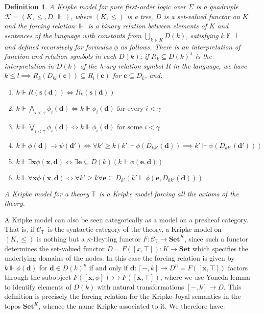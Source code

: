 \documentclass[a4paper,11pt]{article}
\theoremstyle{plain}
\theoremstyle{plain}
\newtheorem{defs}[thm]{Definition}
\theoremstyle{remark}
\newcommand{\synt}[2]{\ensuremath{\mathcal{#1}_{{#2}}}}
\newcommand{\Sets}{\ensuremath{\mathbf{Set}}}
\newcommand{\theory}{\ensuremath{\mathbb{T}}}
\begin{document}
\begin{defs}
 A Kripke model for pure first-order logic over $\Sigma$ is a quadruple $\mathcal{K}=(K, \leq, D, \Vdash)$, where $(K, \leq)$ is a tree, $D$ is a set-valued functor on $K$ and the forcing relation $\Vdash$ is a binary relation between elements of $K$ and sentences of the language with constants from $\bigcup_{k \in K}D(k)$, satisfying $k \nVdash \bot$ and defined recursively for formulas $\phi$ as follows. There is an interpretation of function and relation symbols in each $D(k)$; if $R_k \subseteq D(k)^{\lambda}$ is the interpretation in $D(k)$ of the $\lambda$-ary relation symbol $R$ in the language, we have $k \leq l \implies R_k(D_{kl}(\mathbf{c})) \subseteq R_l(\mathbf{c})$ for $\mathbf{c} \subseteq D_k$, and: 
 
 \begin{enumerate}
  \item $k \Vdash R(\mathbf{s}(\mathbf{d})) \iff R_k(\mathbf{s}(\mathbf{d}))$
  \item $k \Vdash \bigwedge_{i<\gamma}\phi_i(\mathbf{d}) \iff k \Vdash \phi_i(\mathbf{d}) \text{ for every } i<\gamma$
  \item $k \Vdash \bigvee_{i<\gamma}\phi_i(\mathbf{d}) \iff k \Vdash \phi_i(\mathbf{d}) \text{ for some } i<\gamma$
  \item $k \Vdash \phi(\mathbf{d}) \to \psi(\mathbf{d'}) \iff \forall k' \geq k (k' \Vdash \phi(D_{kk'}(\mathbf{d})) \implies k' \Vdash \psi(D_{kk'}(\mathbf{d'})))$
  \item $k \Vdash \exists \mathbf{x} \phi(\mathbf{x}, \mathbf{d}) \iff \exists \mathbf{e} \subseteq D(k) (k \Vdash \phi(\mathbf{e}, \mathbf{d}))$
  \item $k \Vdash \forall \mathbf{x} \phi(\mathbf{x}, \mathbf{d}) \iff \forall k' \geq k \forall \mathbf{e} \subseteq D_{k'} (k' \Vdash \phi(\mathbf{e}, D_{kk'}(\mathbf{d})))$
 \end{enumerate}

 A Kripke model for a theory \theory\ is a Kripke model forcing all the axioms of the theory. 
\end{defs}

A Kripke model can also be seen categorically as a model on a presheaf category. That is, if \synt{C}{\theory}\ is the syntactic category of the theory, a Kripke model on $(K, \leq)$ is nothing but a $\kappa$-Heyting functor $F: \synt{C}{\theory}\to \Sets^{K}$, since such a functor determines the set-valued functor $D=F([x, \top]): K \to \Sets$ which specifies the underlying domains of the nodes. In this case the forcing relation is given by $k \Vdash \phi(\mathbf{d})$ for $\mathbf{d} \in D(k)^n$ if and only if $\mathbf{d}: [-, k] \to D^n=F([\mathbf{x}, \top])$ factors through the subobject $F([\mathbf{x}, \phi]) \rightarrowtail F([\mathbf{x}, \top])$, where we use Yoneda lemma to identify elements of $D(k)$ with natural transformations $[-, k] \to D$. This definition is precisely the forcing relation for the Kripke-Joyal semantics in the topos $\Sets^{K}$, whence the name Kripke associated to it. We therefore have:
\end{document}
